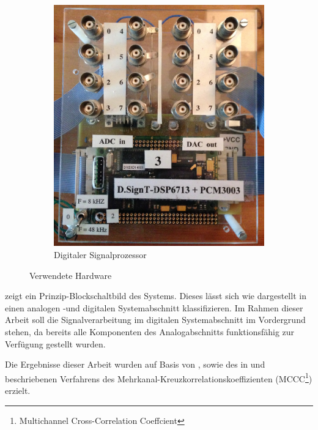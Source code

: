 \begin{figure}
\begin{subfigure}[b]{0.48\textwidth}
                \includegraphics[width=\textwidth]{images/01_Einfuehrung/Foto_DSP}
                \caption{Digitaler Signalprozessor}
                \label{fig:Foto_DSP}
        \end{subfigure}
        \caption{Verwendete Hardware}
\end{figure}



 zeigt ein Prinzip-Blockschaltbild des Systems. Dieses lässt sich wie dargestellt in einen analogen -und digitalen Systemabschnitt klassifizieren. Im Rahmen dieser Arbeit soll die Signalverarbeitung im digitalen Systemabschnitt im Vordergrund stehen, da bereits alle Komponenten des Analogabschnitts funktionsfähig zur Verfügung gestellt wurden.

Die Ergebnisse dieser Arbeit wurden auf Basis von \citet{Master_Array_Pikora}, \citet{Master_Array_Mueller} sowie des in \citet[S. 196ff]{Book_Array_Benesty} und \citet{Paper_Array_Benesty} beschriebenen Verfahrens des Mehrkanal-Kreuzkorrelationskoeffizienten (MCCC\footnote{Multichannel Cross-Correlation Coeffcient}) erzielt.


